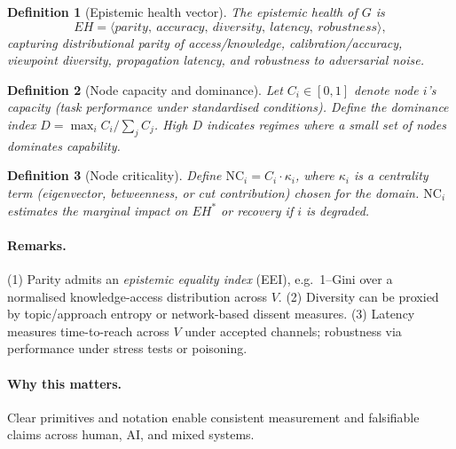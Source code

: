 \documentclass[12pt]{article}
\newtheorem{definition}{Definition}
\begin{document}
\begin{definition}[Epistemic health vector]\label{def:eh}
The \emph{epistemic health} of $G$ is
\[
EH=\langle parity,\ accuracy,\ diversity,\ latency,\ robustness\rangle,
\]
capturing distributional parity of access/knowledge, calibration/accuracy, viewpoint diversity, propagation latency, and robustness to adversarial noise.
\end{definition}

\begin{definition}[Node capacity and dominance]\label{def:capacity}
Let $C_i\in[0,1]$ denote node $i$'s capacity (task performance under standardised conditions). Define the \emph{dominance index} $D=\max_i C_i/\sum_j C_j$. High $D$ indicates regimes where a small set of nodes dominates capability.
\end{definition}

\begin{definition}[Node criticality]\label{def:criticality}
Define $\mathrm{NC}_i=C_i \cdot \kappa_i$, where $\kappa_i$ is a centrality term (eigenvector, betweenness, or cut contribution) chosen for the domain. $\mathrm{NC}_i$ estimates the marginal impact on $EH^{\ast}$ or recovery if $i$ is degraded.
\end{definition}


\paragraph{Remarks.}
(1) Parity admits an \emph{epistemic equality index} (EEI), e.g.\ 1--Gini over a normalised knowledge-access distribution across $V$. 
(2) Diversity can be proxied by topic/approach entropy or network-based dissent measures. 
(3) Latency measures time-to-reach across $V$ under accepted channels; robustness via performance under stress tests or poisoning.

\paragraph{Why this matters.} Clear primitives and notation enable consistent measurement and falsifiable claims across human, AI, and mixed systems.
\end{document}
